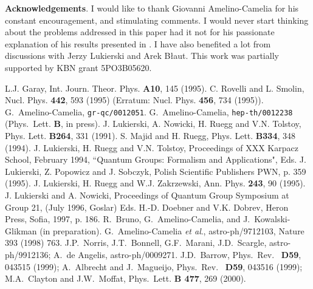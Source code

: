 \documentclass [11pt] {article}
\begin{document}
{\bf Acknowledgements}. I would like to thank Giovanni Amelino-Camelia for 
his constant encouragement, and stimulating comments. I would never  start 
thinking about the problems addressed in this paper had it not for his 
passionate explanation of his results presented in \cite{gac1, gac2}. I 
have also benefited a lot from discussions with Jerzy Lukierski and Arek 
B\l{}aut. This work was partially supported by KBN grant 5PO3B05620. 









































\begin{thebibliography}{99}



 L.J. Garay, Int. Journ. Theor. Phys. {\bf A10},
145 (1995).
 C. Rovelli and L. Smolin, Nucl. Phys. {\bf 442},
593 (1995) (Erratum: Nucl. Phys. {\bf 456}, 734 (1995)).
 G.~Amelino-Camelia, {\tt gr-qc/0012051}.
 G.~Amelino-Camelia, {\tt hep-th/0012238} (Phys.~Lett. {\bf B}, in press).
 J. Lukierski, A. Nowicki, H. Ruegg and V.N. Tolstoy,
Phys. Lett.  {\bf B264}, 331 (1991).
 S. Majid and H. Ruegg, Phys. Lett. {\bf B334},
348 (1994).
 J. Lukierski, H. Ruegg and V.N. Tolstoy,
Proceedings of XXX Karpacz School, February 1994, ``Quantum
Groups: Formalism and Applications", Eds. J. Lukierski,
 Z. Popowicz and J. Sobczyk, Polish Scientific Publishers PWN,
p. 359 (1995).
 J. Lukierski, H. Ruegg and W.J. Zakrzewski, Ann.
Phys. {\bf 243}, 90 (1995).
 J. Lukierski and A. Nowicki, Proceedings of
Quantum Group Symposium at Group 21, (July 1996, Goslar) Eds.
H.-D. Doebner and V.K. Dobrev, Heron Press, Sofia, 1997, p. 186.
 R.~Bruno, G.~Amelino-Camelia, and J.~Kowalski-Glikman (in preparation).
 G.~Amelino-Camelia {\it et al}., 
 astro-ph/9712103, Nature 393 (1998) 763. 
  J.P.~Norris, J.T.~Bonnell, G.F.~Marani, 
 J.D.~Scargle, astro-ph/9912136;  A.~de Angelis, astro-ph/0009271.
 J.D.~Barrow, Phys.~Rev.~ {\bf D59}, 043515 (1999); A.~Albrecht and J.~Magueijo, 
Phys.~Rev.~ {\bf D59}, 043516 (1999); M.A.~Clayton and J.W.~Moffat, 
Phys.~Lett. {\bf B 477}, 269 (2000). 
\end{thebibliography}
\end{document}
